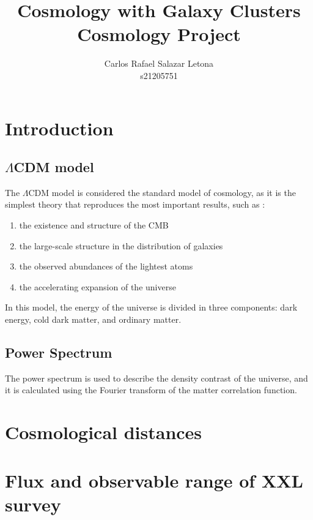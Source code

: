 \documentclass[12pt]{article}
\begin{document}
\title{Cosmology with Galaxy Clusters \\ Cosmology Project}
\author{Carlos Rafael Salazar Letona \\ s21205751}
\maketitle

\section{Introduction}


\subsection{$\Lambda$CDM model}
The $\Lambda$CDM model is considered the standard model of cosmology, as it is the simplest theory that reproduces the most important results, such as \cite{ref:lambdacdm}:

\begin{enumerate}
\item the existence and structure of the CMB
\item the large-scale structure in the distribution of galaxies
\item the observed abundances of the lightest atoms
\item the accelerating expansion of the universe
\end{enumerate}
In this model, the energy of the universe is divided in three components: dark energy, cold dark matter, and ordinary matter.


\subsection{Power Spectrum}
The power spectrum is used to describe the density contrast of the universe, and it is calculated using the Fourier transform of the matter correlation function\cite{ref:powerspectrum}.


\section{Cosmological distances}

\subsection{}



\section{Flux and observable range of XXL survey}
\end{document}
